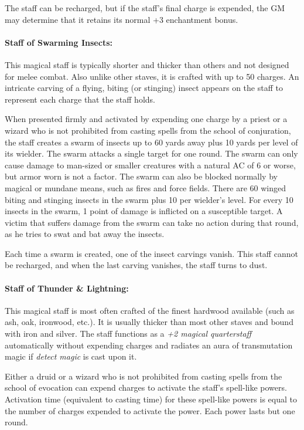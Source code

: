 \begin{multicols}{2}
The staff can be recharged, but if the staff's final charge is expended, the GM may determine that it retains its normal +3 enchantment bonus.

\paragraph{Staff of Swarming Insects:} This magical staff is typically shorter and thicker than others and not designed for melee combat.  Also unlike other staves, it is crafted with up to 50 charges.  An intricate carving of a flying, biting (or stinging) insect appears on the staff to represent each charge that the staff holds.
 
When presented firmly and activated by expending one charge by a priest or a wizard who is not prohibited from casting spells from the school of conjuration, the staff creates a swarm of insects up to 60 yards away plus 10 yards per level of its wielder.  The swarm attacks a single target for one round.  The swarm can only cause damage to man-sized or smaller creatures with a natural AC of 6 or worse, but armor worn is not a factor.  The swarm can also be blocked normally by magical or mundane means, such as fires and force fields.  There are 60 winged biting and stinging insects in the swarm plus 10 per wielder's level.  For every 10 insects in the swarm, 1 point of damage is inflicted on a susceptible target.  A victim that suffers damage from the swarm can take no action during that round, as he tries to swat and bat away the insects.  

Each time a swarm is created, one of the insect carvings vanish.  This staff cannot be recharged, and when the last carving vanishes, the staff turns to dust.

\paragraph{Staff of Thunder \& Lightning:} This magical staff is most often crafted of the finest hardwood available (such as ash, oak, ironwood, etc.).  It is usually thicker than most other staves and bound with iron and silver.  The staff functions as a \textit{+2 magical quarterstaff} automatically without expending charges and radiates an aura of transmutation magic if \textit{detect magic} is cast upon it. 

Either a druid or a wizard who is not prohibited from casting spells from the school of evocation can expend charges to activate the staff's spell-like powers.  Activation time (equivalent to casting time) for these spell-like powers is equal to the number of charges expended to activate the power.  Each power lasts but one round.


\end{multicols}
